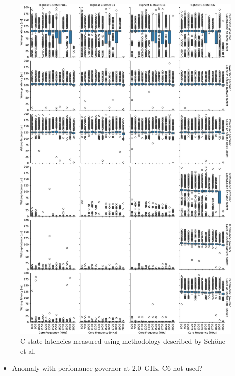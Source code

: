 \begin{figure}[]
    \centering
    \includegraphics[width=\columnwidth]{fig/C_state_latencies.pdf}
    \caption{\label{fig:c6_latencies}C-state latencies measured using methodology described by Schöne et al.}
\end{figure}

\begin{itemize}
    \item Anomaly with perfomance governor at \SI{2.0}{\GHz}, C6 not used?
\end{itemize}
